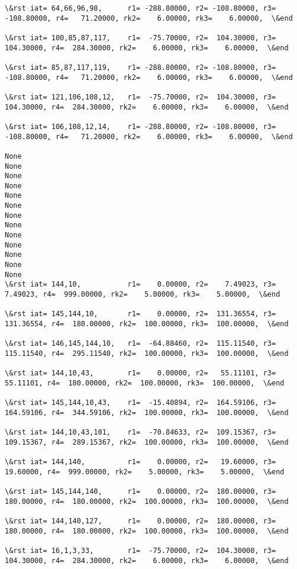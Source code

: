 \documentclass[11pt]{article}
\begin{document}
\begin{Verbatim}[commandchars=\\\{\}]
\&rst iat= 64,66,96,98,      r1= -288.80000, r2= -108.80000, r3= -108.80000, r4=   71.20000, rk2=    6.00000, rk3=    6.00000,  \&end

\&rst iat= 100,85,87,117,    r1=  -75.70000, r2=  104.30000, r3=  104.30000, r4=  284.30000, rk2=    6.00000, rk3=    6.00000,  \&end

\&rst iat= 85,87,117,119,    r1= -288.80000, r2= -108.80000, r3= -108.80000, r4=   71.20000, rk2=    6.00000, rk3=    6.00000,  \&end

\&rst iat= 121,106,108,12,   r1=  -75.70000, r2=  104.30000, r3=  104.30000, r4=  284.30000, rk2=    6.00000, rk3=    6.00000,  \&end

\&rst iat= 106,108,12,14,    r1= -288.80000, r2= -108.80000, r3= -108.80000, r4=   71.20000, rk2=    6.00000, rk3=    6.00000,  \&end

None
None
None
None
None
None
None
None
None
None
None
None
None
\&rst iat= 144,10,           r1=    0.00000, r2=    7.49023, r3=    7.49023, r4=  999.00000, rk2=    5.00000, rk3=    5.00000,  \&end

\&rst iat= 145,144,10,       r1=    0.00000, r2=  131.36554, r3=  131.36554, r4=  180.00000, rk2=  100.00000, rk3=  100.00000,  \&end

\&rst iat= 146,145,144,10,   r1=  -64.88460, r2=  115.11540, r3=  115.11540, r4=  295.11540, rk2=  100.00000, rk3=  100.00000,  \&end

\&rst iat= 144,10,43,        r1=    0.00000, r2=   55.11101, r3=   55.11101, r4=  180.00000, rk2=  100.00000, rk3=  100.00000,  \&end

\&rst iat= 145,144,10,43,    r1=  -15.40894, r2=  164.59106, r3=  164.59106, r4=  344.59106, rk2=  100.00000, rk3=  100.00000,  \&end

\&rst iat= 144,10,43,101,    r1=  -70.84633, r2=  109.15367, r3=  109.15367, r4=  289.15367, rk2=  100.00000, rk3=  100.00000,  \&end

\&rst iat= 144,140,          r1=    0.00000, r2=   19.60000, r3=   19.60000, r4=  999.00000, rk2=    5.00000, rk3=    5.00000,  \&end

\&rst iat= 145,144,140,      r1=    0.00000, r2=  180.00000, r3=  180.00000, r4=  180.00000, rk2=  100.00000, rk3=  100.00000,  \&end

\&rst iat= 144,140,127,      r1=    0.00000, r2=  180.00000, r3=  180.00000, r4=  180.00000, rk2=  100.00000, rk3=  100.00000,  \&end

\&rst iat= 16,1,3,33,        r1=  -75.70000, r2=  104.30000, r3=  104.30000, r4=  284.30000, rk2=    6.00000, rk3=    6.00000,  \&end


\end{Verbatim}
\end{document}
